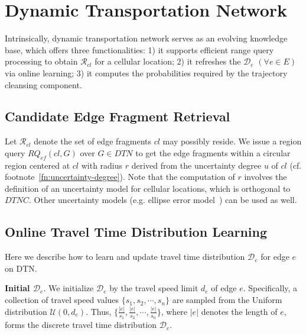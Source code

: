 \documentclass{vldb}
\begin{document}
	\section{Dynamic Transportation Network}
	\label{sec:pro-com} 
	
	Intrinsically, dynamic transportation network serves as an evolving knowledge base, 
	which offers three functionalities:
	1) it supports efficient range query processing to obtain  $\mathcal{R}_{cl}$ for a cellular location;
	2) it refreshes the $\mathcal{D}_{e}$ $(\forall e\in E)$ via online learning;
	3) it computes the probabilities required by the trajectory cleansing component.
	
	
	\subsection{Candidate Edge Fragment Retrieval}
	\label{sub-sec:eff-rcl-retrieval}
	
	Let $\mathcal{R}_{cl}$ denote the set of edge fragments $cl$ may possibly reside.
	We issue a region query $RQ_{ef}(cl,G)$ over $G\in DTN$ to get the edge fragments within a circular region centered at $cl$ with radius $r$ derived from the uncertainty degree $u$ of $cl$ (cf. footnote~\ref{fn:uncertainty-degree}).
	Note that the computation of $r$ involves the definition of an uncertainty model for cellular locations, which is orthogonal to $DTNC$.
	Other uncertainty models (e.g. ellipse error model~\cite{pfoser1999capturing}) can be used as well.
		
	\subsection{Online Travel Time Distribution Learning }
	\label{subsec:de}
		
	Here we describe how to learn and update travel time distribution $\mathcal{D}_e$ for edge $e$ on DTN.   
	
	\textbf{Initial $\mathcal{D}_e$}. We initialize 
	$\mathcal{D}_e$ 
	by the travel speed limit $d_e$ of edge $e$. Specifically, a collection of travel speed values $\{s_1, s_2,\cdots, s_n\}$ are sampled from the Uniform distribution $\mathcal{U}(0,d_e)$. Thus, $\{\frac{|e|}{s_1}, \frac{|e|}{s_2}, \cdots, \frac{|e|}{s_n}\}$, where $|e|$ denotes the length of $e$, forms the discrete travel time distribution $\mathcal{D}_e$.
	
\end{document}
